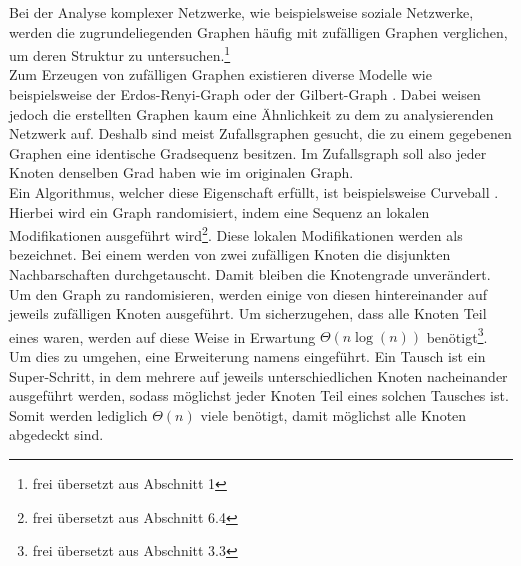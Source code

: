 \glqq Bei der Analyse komplexer Netzwerke, wie beispielsweise soziale Netzwerke, 
werden die zugrundeliegenden Graphen häufig mit zufälligen Graphen verglichen, 
um deren Struktur zu untersuchen.\grqq\footnote{frei übersetzt aus \cite{DBLP:conf/esa/CarstensH0PTW18} Abschnitt 1}
\\

Zum Erzeugen von zufälligen Graphen existieren diverse Modelle wie beispielsweise der Erdos-Renyi-Graph \cite{erdos}
oder der Gilbert-Graph \cite{gilbert}.
Dabei weisen jedoch die erstellten Graphen kaum eine Ähnlichkeit zu dem zu analysierenden Netzwerk auf.
Deshalb sind meist Zufallsgraphen gesucht, die zu einem gegebenen Graphen eine identische Gradsequenz
besitzen. Im Zufallsgraph soll also jeder Knoten denselben Grad haben wie im originalen Graph.
\\

Ein Algorithmus, welcher diese Eigenschaft erfüllt, ist beispielsweise Curveball \cite{curveball}.
Hierbei wird ein Graph \glqq randomisiert, indem eine Sequenz an lokalen Modifikationen ausgeführt wird\grqq\footnote{\label{ftn:survey}frei übersetzt aus \cite{penschuck2020recent} Abschnitt 6.4}.
Diese lokalen Modifikationen werden als \ct{} bezeichnet. Bei einem \ct{} werden von zwei zufälligen 
Knoten die disjunkten Nachbarschaften durchgetauscht. Damit bleiben die Knotengrade unverändert.
Um den Graph zu randomisieren, werden einige von diesen  hintereinander auf jeweils zufälligen Knoten ausgeführt.
Um sicherzugehen, dass alle Knoten Teil eines  waren, werden auf diese Weise
\glqq in Erwartung $\Theta(n\log(n))$   benötigt\grqq \footnote{frei übersetzt aus \cite{DBLP:conf/esa/CarstensH0PTW18} Abschnitt 3.3}.
Um dies zu umgehen,  eine Erweiterung namens \gc{} \cite{DBLP:conf/esa/CarstensH0PTW18} eingeführt. 
Ein \gc{} Tausch ist ein \glqq Super-Schritt\grqq {}, in dem mehrere  auf jeweils
unterschiedlichen Knoten nacheinander ausgeführt werden, sodass möglichst jeder Knoten Teil eines solchen Tausches ist. 
Somit werden lediglich $\Theta(n)$ viele  benötigt, %
damit möglichst alle Knoten abgedeckt sind.
\\

